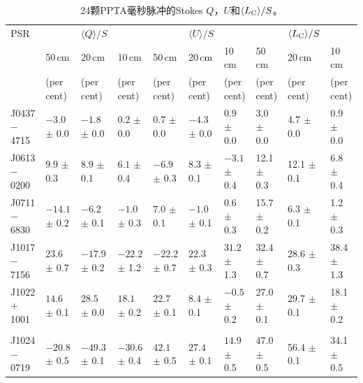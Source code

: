 %
\begin{landscape}
\begin{table}
\small
\begin{center}
\caption{24颗PPTA毫秒脉冲的Stokes $Q$，$U$和$\langle L_{\rm{C}} \rangle/S$。}
\label{tablePol2}
\begin{tabular}{p{1.9cm}p{1.88cm}p{1.88cm}p{1.88cm}p{1.88cm}p{1.88cm}p{1.88cm}p{1.8cm}p{1.8cm}p{1.8cm}}
\hline
PSR              &                  &    $\langle Q \rangle/S$    &                  &               & $\langle U \rangle/S$       &                  &      &      $\langle L_{\rm{C}}\rangle/S$       &                      \\
								 &    50\,cm      &   20\,cm       &    10\,cm &    50\,cm      &   20\,cm       &    10\,cm &    50\,cm      &   20\,cm       &    10\,cm              \\
								 &     (per cent)   &         (per cent)          &     (per cent)   &    (per cent)   &         (per cent)          &     (per cent)   &   (per cent)   &         (per cent)          &     (per cent)  \\
\hline
J0437$-$4715 &$-3.0 $ $\pm$ 0.0 & $-1.8 $ $\pm$ 0.0 & $0.2  $ $\pm$ 0.0 & $0.7  $ $\pm$ 0.0 & $-4.3 $ $\pm$ 0.0 & $0.9  $ $\pm$ 0.0 & 3.0  $\pm$ 0.0 & 4.7  $\pm$ 0.0 & 0.9  $\pm$ 0.0 \\
J0613$-$0200 &$9.9  $ $\pm$ 0.3 & $8.9  $ $\pm$ 0.1 & $6.1  $ $\pm$ 0.4 & $-6.9 $ $\pm$ 0.3 & $8.3  $ $\pm$ 0.1 & $-3.1 $ $\pm$ 0.4 & 12.1 $\pm$ 0.3 & 12.1 $\pm$ 0.1 & 6.8  $\pm$ 0.4 \\
J0711$-$6830 &$-14.1$ $\pm$ 0.2 & $-6.2 $ $\pm$ 0.1 & $-1.0 $ $\pm$ 0.3 & $7.0  $ $\pm$ 0.1 & $-1.0 $ $\pm$ 0.1 & $0.6  $ $\pm$ 0.3 & 15.7 $\pm$ 0.2 & 6.3  $\pm$ 0.1 & 1.2  $\pm$ 0.3 \\
J1017$-$7156 &$23.6 $ $\pm$ 0.7 & $-17.9$ $\pm$ 0.2 & $-22.2$ $\pm$ 1.2 & $-22.2$ $\pm$ 0.7 & $22.3 $ $\pm$ 0.3 & $31.2 $ $\pm$ 1.3 & 32.4 $\pm$ 0.7 & 28.6 $\pm$ 0.3 & 38.4 $\pm$ 1.3 \\
J1022$+$1001 &$14.6 $ $\pm$ 0.1 & $28.5 $ $\pm$ 0.0 & $18.1 $ $\pm$ 0.2 & $22.7 $ $\pm$ 0.1 & $8.4  $ $\pm$ 0.1 & $-0.5 $ $\pm$ 0.2 & 27.0 $\pm$ 0.1 & 29.7 $\pm$ 0.1 & 18.1 $\pm$ 0.2 \\
             &                &                 &                &                   &                   &                   &                &                &                 \\
J1024$-$0719 &$-20.8$ $\pm$ 0.5 & $-49.3$ $\pm$ 0.1 & $-30.6$ $\pm$ 0.4 & $42.1 $ $\pm$ 0.5 & $27.4 $ $\pm$ 0.1 & $14.9 $ $\pm$ 0.5 & 47.0 $\pm$ 0.5 & 56.4 $\pm$ 0.1 & 34.1 $\pm$ 0.5 \\

\end{tabular}
\end{center}
\end{table}
\end{landscape}
